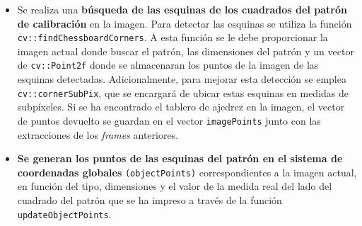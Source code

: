 \begin{itemize}

\item Se realiza una \textbf{búsqueda de las esquinas de los cuadrados del patrón de calibración} en la imagen. Para detectar las esquinas se utiliza la función \texttt{cv::findChessboardCorners}. A esta función se le debe proporcionar la imagen actual donde buscar el patrón, las dimensiones del patrón y un vector de \texttt{cv::Point2f} donde se almacenaran los puntos de la imagen de las esquinas detectadas. Adicionalmente, para mejorar esta detección se emplea \texttt{cv::cornerSubPix}, que se encargará de ubicar estas esquinas en medidas de subpíxeles. Si se ha encontrado el tablero de ajedrez en la imagen, el vector de puntos devuelto se guardan en el vector \texttt{imagePoints} junto con las extracciones de los \textit{frames} anteriores.  

%
%    
%  

\item \textbf{Se generan los puntos de las esquinas del patrón en el sistema de coordenadas globales} \texttt{(objectPoints)} correspondientes a la imagen actual, en función del tipo, dimensiones y el valor de la medida real del lado del cuadrado del patrón que se ha impreso a través de la función \texttt{updateObjectPoints}.


\end{itemize}
